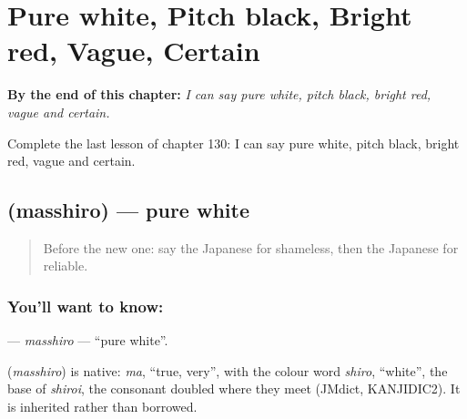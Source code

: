 
\chapter{Pure white, Pitch black, Bright red, Vague, Certain}
\label{ch:ja-pure-white-pitch-black-bright-red-vague-certain}

\begin{chapteropening}
\textbf{By the end of this chapter:} \emph{I can say pure white, pitch black, bright red, vague and certain.}

Complete the last lesson of chapter 130: I can say pure white, pitch black, bright red, vague and certain.
\end{chapteropening}

\section[\texorpdfstring{\ja{まっしろ} (masshiro)}{まっしろ (masshiro)}]{ (masshiro) — pure white}

\label{lesson:JA-C130-masshiro}



\begin{quote}
Before the new one: say the Japanese for shameless, then the Japanese for reliable.
\end{quote}

\subsection*{You'll want to know: }
\textbf{} — \emph{masshiro} — \textquotedblleft{}pure white\textquotedblright{}.

\begin{cousinweb}
\textbf{} (\emph{masshiro}) is native: \emph{ma}, \textquotedblleft{}true, very\textquotedblright{}, with the colour word \emph{shiro}, \textquotedblleft{}white\textquotedblright{}, the base of \emph{shiroi}, the consonant doubled where they meet (JMdict, KANJIDIC2). It is inherited rather than borrowed.
\end{cousinweb}

